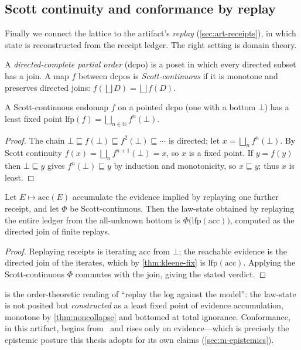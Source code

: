 \subsection{Scott continuity and conformance by replay}
\label{sec:order-scott}

Finally we connect the lattice to the artifact's \emph{replay} (\cref{sec:art-receipts}),
in which state is reconstructed from the receipt ledger. The right setting is
domain theory.

\begin{definition}
A \emph{directed-complete partial order} (dcpo) is a poset in which every directed
subset has a join. A map $f$ between dcpos is \emph{Scott-continuous} if it is
monotone and preserves directed joins: $f(\bigsqcup D)=\bigsqcup f(D)$.
\end{definition}

\begin{theorem}
\label{thm:kleene-fix}
A Scott-continuous endomap $f$ on a pointed dcpo (one with a bottom $\bot$) has a
least fixed point $\mathrm{lfp}(f)=\bigsqcup_{n\in\mathbb N}f^{n}(\bot)$.
\end{theorem}
\begin{proof}
The chain $\bot\sqsubseteq f(\bot)\sqsubseteq f^2(\bot)\sqsubseteq\cdots$ is
directed; let $x=\bigsqcup_n f^n(\bot)$. By Scott continuity
$f(x)=\bigsqcup_n f^{n+1}(\bot)=x$, so $x$ is a fixed point. If $y=f(y)$ then
$\bot\sqsubseteq y$ gives $f^n(\bot)\sqsubseteq y$ by induction and monotonicity,
so $x\sqsubseteq y$; thus $x$ is least.
\end{proof}

\begin{proposition}
\label{prop:replay-lfp}
Let $E\mapsto\mathrm{acc}(E)$ accumulate the evidence implied by replaying one
further receipt, and let $\Phi$ be Scott-continuous. Then the law-state obtained
by replaying the entire ledger from the all-unknown bottom is
$\Phi\bigl(\mathrm{lfp}(\mathrm{acc})\bigr)$, computed as the directed join of
finite replays.
\end{proposition}
\begin{proof}
Replaying receipts is iterating $\mathrm{acc}$ from $\bot$; the reachable evidence
is the directed join of the iterates, which by \cref{thm:kleene-fix} is
$\mathrm{lfp}(\mathrm{acc})$. Applying the Scott-continuous $\Phi$ commutes with
the join, giving the stated verdict.
\end{proof}

 is the order-theoretic reading of ``replay the log against
the model'': the law-state is not posited but \emph{constructed} as a least fixed
point of evidence accumulation, monotone by \cref{thm:noncollapse} and bottomed
at total ignorance. Conformance, in this artifact, begins from \unknownstat\ and
rises only on evidence---which is precisely the epistemic posture this thesis
adopts for its own claims (\cref{sec:m-epistemics}).
